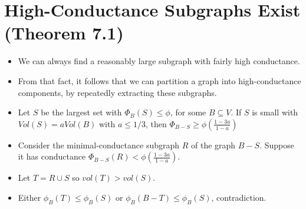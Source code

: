 \documentclass[11pt]{article}
\begin{document}
\section{High-Conductance Subgraphs Exist (Theorem 7.1)}
\label{sec:org9b393ce}
\begin{itemize}
\item We can always find a reasonably large subgraph with fairly high conductance.
\item From that fact, it follows that we can partition a graph into high-conductance components, by repeatedly extracting these subgraphs.
\item Let \(S\) be the largest set with \(\Phi_B(S) \le \phi\), for some \(B \subseteq V\). If \(S\) is small with \(Vol(S) = a Vol(B)\) with \(a\le 1/3\), then \(\Phi_{B-S} \ge \phi(\frac{1-3a}{1-a})\)
\item Consider the minimal-conductance subgraph \(R\) of the graph \(B-S\). Suppose it has conductance \(\Phi_{B-S}(R) < \phi (\frac{1-3a}{1-a})\).
\item Let \(T= R \cup S\) so \(vol(T) > vol(S)\).
\item Either \(\phi_B(T) \le \phi_B(S)\) or \(\phi_B(B-T) \le \phi_B(S)\), contradiction.
\end{itemize}
\end{document}
